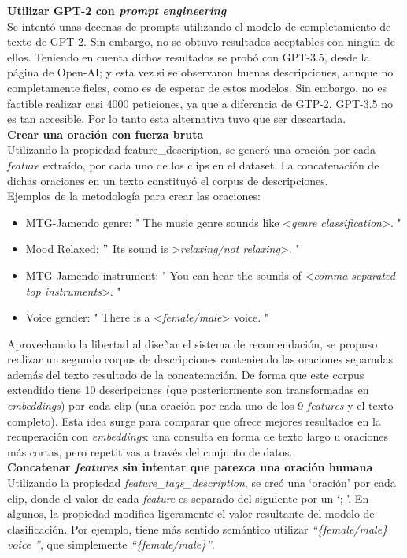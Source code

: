 \textbf{Utilizar GPT-2 con \textit{prompt engineering}}\\
Se intentó unas decenas de prompts utilizando el modelo de completamiento de texto de GPT-2. Sin embargo, no se obtuvo resultados aceptables con ningún de ellos. Teniendo en cuenta dichos resultados se probó con GPT-3.5, desde la página de Open-AI; y esta vez si se observaron buenas descripciones, aunque no completamente fieles, como es de esperar de estos modelos. Sin embargo, no es factible realizar casi 4000 peticiones, ya que a diferencia de GTP-2, GPT-3.5 no es tan accesible. Por lo tanto esta alternativa tuvo que ser descartada.\\

\textbf{Crear una oración con fuerza bruta}\\
Utilizando la propiedad feature\_description, se generó una oración por cada \textit{feature} extraído, por cada uno de los clips en el dataset. La concatenación de dichas oraciones en un texto constituyó el corpus de descripciones. \\
Ejemplos de la metodología para crear las oraciones:
\begin{itemize}
    \item MTG-Jamendo genre: " The music genre sounds like <\textit{genre classification}>. "
    \item Mood Relaxed: $"$ Its sound is >\textit{relaxing/not relaxing}>. "
    \item MTG-Jamendo instrument: " You can hear the sounds of <\textit{comma separated top instruments}>. "
    \item Voice gender: " There is a <\textit{female/male}> voice. "
\end{itemize}
Aprovechando la libertad al diseñar el sistema de recomendación, se propuso realizar un segundo corpus de descripciones conteniendo las oraciones separadas además del texto resultado de la concatenación. De forma que este corpus extendido tiene 10 descripciones (que posteriormente son transformadas en \textit{embeddings}) por cada clip (una oración por cada uno de los 9 \textit{features} y el texto completo). Esta idea surge para comparar que ofrece mejores resultados en la recuperación con \textit{embeddings}: una consulta en forma de texto largo u oraciones más cortas, pero repetitivas a través del conjunto de datos.\\

\textbf{Concatenar \textit{features} sin intentar que parezca una oración humana}\\
Utilizando la propiedad \textit{feature\_tags\_description}, se creó una `oración' por cada clip, donde el valor de cada \textit{feature} es separado del siguiente por un `; '. En algunos, la propiedad modifica ligeramente el valor resultante del modelo de clasificación. Por ejemplo, tiene más sentido semántico utilizar \textit{``\{female/male\} voice ''}, que simplemente \textit{``\{female/male\}''}.\\

